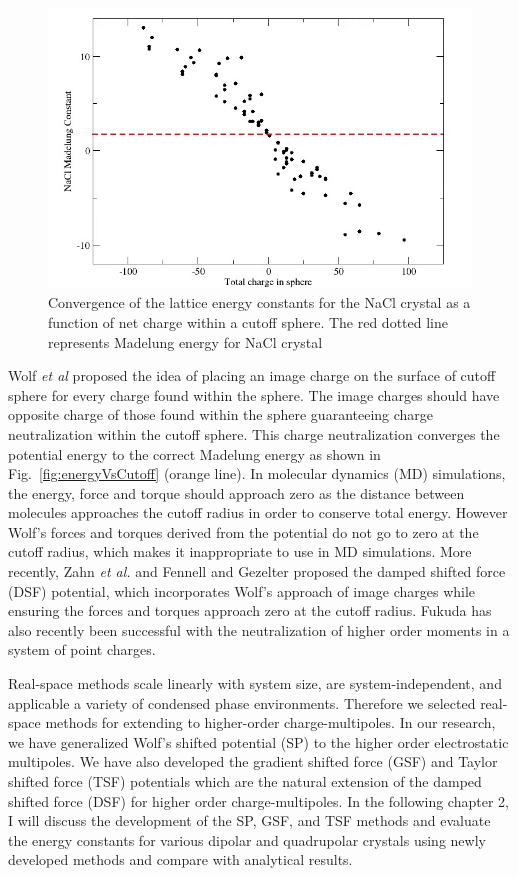 \begin{figure}[tpb]
  \begin{center}
    \centerline{\includegraphics[width = \linewidth]{energyVsNetcharge.png}}
    \caption{Convergence of the lattice energy constants for the NaCl crystal as a function of net charge within a cutoff sphere. The red dotted line represents Madelung energy for NaCl crystal}
    \label{fig:energyVsCharge}
  \end{center}
\end{figure}
Wolf \textit{et al} \cite{Wolf99} proposed the idea of placing an image charge on the surface of cutoff sphere for every charge found within the sphere. The image charges should have opposite charge of those found within the sphere guaranteeing charge neutralization  within the cutoff sphere.\cite{Wolf99} This charge neutralization converges the potential energy to the correct Madelung energy as shown in Fig.~\ref{fig:energyVsCutoff} (orange line). In molecular dynamics (MD) simulations, the energy, force and torque should approach zero as the distance between molecules approaches the cutoff radius  in order to conserve total energy. However Wolf's forces and torques derived from the potential do not go to zero at the cutoff radius, which makes it inappropriate to use in MD simulations. More recently, Zahn \textit{et al.} and Fennell and Gezelter proposed the damped shifted force (DSF) potential, which incorporates Wolf's approach of image charges while ensuring the forces and torques approach zero at the cutoff radius.\cite{Zahn02, Gezelter06} Fukuda has also recently been successful with the neutralization of higher order moments in a system of point charges.\cite{Fukuda13}

Real-space methods scale linearly with system size, are system-independent, and applicable a variety of condensed phase environments. Therefore we selected real-space methods for extending to higher-order charge-multipoles. In our research, we have generalized Wolf's shifted potential (SP) to the higher order electrostatic multipoles. We have also developed the gradient shifted force (GSF) and Taylor shifted force (TSF) potentials which are the natural extension of the damped shifted force (DSF) for higher order charge-multipoles. In the following chapter 2, I will discuss the development of the SP, GSF, and TSF methods and evaluate the energy constants for various dipolar and quadrupolar crystals using newly developed methods and compare with analytical results.\cite{Lamichhane14_I} 